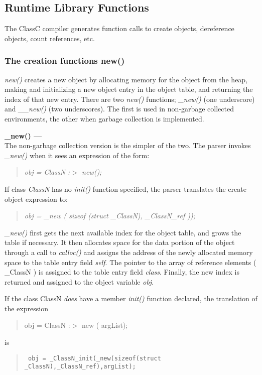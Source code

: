 \subsection {Runtime Library Functions}
The ClassC compiler generates function calls to create objects, dereference
objects, count references, etc.
\subsubsection{The creation functions new()}
{\em new()} creates a new object by allocating memory for the object from the
heap, making and initializing a new object
entry in the object table, and returning the index of that new entry.
There are two {\em new()} functions; {\em \_new()} (one underscore) and
{\em \_\_new()}
(two underscores).  The first is used in non-garbage collected environments,
the other when garbage collection is implemented.

{\flushleft \large \bf \_new() ---\\}
The non-garbage collection version is the simpler of the two.
The parser invokes {\em \_new()} when it sees an expression of the form:
\begin{quote} \em obj = ClassN :$>$ new(); \end{quote}

If class {\em ClassN} has no {\em init()} function specified, the parser
translates the create object expression to:
\begin{quote}
    \em obj = \_new ( sizeof (struct \_ClassN), \_ClassN\_ref ));
\end{quote}

{\em \_new()} first gets the next available index for the object table, and
grows the table if necessary.  It then allocates space for the data
portion of the object through a call to {\em calloc()}
and assigns the address of the newly allocated memory
space to the table entry field {\em self}.  The pointer to the array of
reference elements ( \_ClassN ) is assigned to the table entry field
{\em class}.  Finally, the new index is returned and assigned to
the object variable {\em obj}.

If the class ClassN
{\em does} have a member {\em init()} function declared, the translation
of the expression
\begin{quote} obj = ClassN :$>$ new ( argList); \end{quote}
is
\begin{quote} \tt
obj = \_ClassN\_init(\_new(sizeof(struct \_ClassN),\_ClassN\_ref),argList);
\end{quote}

